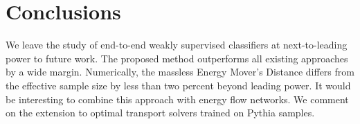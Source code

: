 \section{Conclusions}\label{sec:conclusions}

We leave the study of end-to-end weakly supervised classifiers at
next-to-leading power to future work. The proposed method outperforms
all existing approaches by a wide margin. Numerically, the massless
Energy Mover's Distance differs from the effective sample size by less
than two percent beyond leading power. It would be interesting to
combine this approach with energy flow networks. We comment on the
extension to optimal transport solvers trained on Pythia samples.

